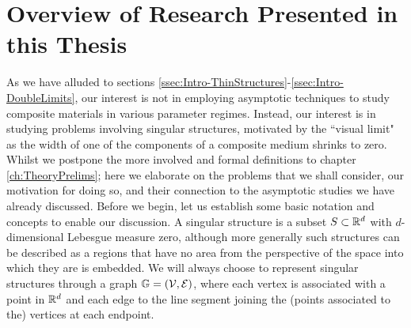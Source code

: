 \section{Overview of Research Presented in this Thesis} \label{sec:Intro-ProblemIntroduction}
As we have alluded to sections \ref{ssec:Intro-ThinStructures}-\ref{ssec:Intro-DoubleLimits}, our interest is not in employing asymptotic techniques to study composite materials in various parameter regimes.
Instead, our interest is in studying problems involving singular structures, motivated by the ``visual limit" as the width of one of the components of a composite medium shrinks to zero.
Whilst we postpone the more involved and formal definitions to chapter \ref{ch:TheoryPrelims}; here we elaborate on the problems that we shall consider, our motivation for doing so, and their connection to the asymptotic studies we have already discussed.
Before we begin, let us establish some basic notation and concepts to enable our discussion.
A singular structure is a subset $S\subset\mathbb{R}^d$ with $d$-dimensional Lebesgue measure zero, although more generally such structures can be described as a regions that have no area from the perspective of the space into which they are is embedded.
We will always choose to represent singular structures through a graph $\mathbb{G}=\left( \mathcal{V},\mathcal{E} \right)$, where each vertex is associated with a point in $\mathbb{R}^d$ and each edge to the line segment joining the (points associated to the) vertices at each endpoint.

